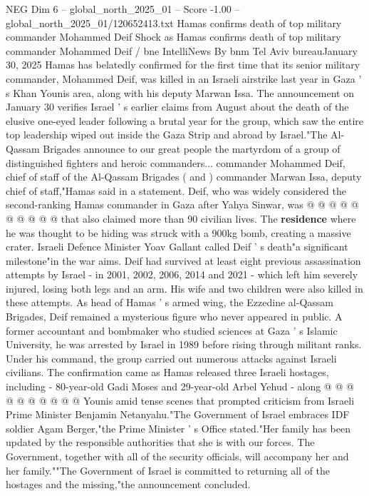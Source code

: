 \begin{textsample}{NEG Dim 6 – global\_north\_2025\_01 – Score -1.00 – global\_north\_2025\_01/120652413.txt}  \label{ex:f6_neg_178}
Hamas confirms death of top military commander Mohammed Deif Shock as Hamas confirms death of top military commander Mohammed Deif / bne IntelliNews By bnm Tel Aviv bureauJanuary 30, 2025 Hamas has belatedly confirmed for the first time that its senior military commander, Mohammed Deif, was killed in an Israeli airstrike last year in Gaza ' s Khan Younis area, along with his deputy Marwan Issa.
The announcement on January 30 verifies Israel ' s earlier claims from August about the death of the elusive one-eyed leader following a brutal year for the group, which saw the entire top leadership wiped out inside the Gaza Strip and abroad by Israel."The Al-Qassam Brigades announce to our great people the martyrdom of a group of distinguished fighters and heroic commanders... commander Mohammed Deif, chief of staff of the Al-Qassam Brigades ( and ) commander Marwan Issa, deputy chief of staff,"Hamas said in a statement.
Deif, who was widely considered the second-ranking Hamas commander in Gaza after Yahya Sinwar, was @ @ @ @ @ @ @ @ @ @ that also claimed more than 90 civilian lives.
The \textbf{residence} where he was thought to be hiding was struck with a 900kg bomb, creating a massive crater.
Israeli Defence Minister Yoav Gallant called Deif ' s death"a significant milestone"in the war aims.
Deif had survived at least eight previous assassination attempts by Israel - in 2001, 2002, 2006, 2014 and 2021 - which left him severely injured, losing both legs and an arm.
His wife and two children were also killed in these attempts.
As head of Hamas ' s armed wing, the Ezzedine al-Qassam Brigades, Deif remained a mysterious figure who never appeared in public.
A former accountant and bombmaker who studied sciences at Gaza ' s Islamic University, he was arrested by Israel in 1989 before rising through militant ranks.
Under his command, the group carried out numerous attacks against Israeli civilians.
The confirmation came as Hamas released three Israeli hostages, including - 80-year-old Gadi Moses and 29-year-old Arbel Yehud - along @ @ @ @ @ @ @ @ @ @ Younis amid tense scenes that prompted criticism from Israeli Prime Minister Benjamin Netanyahu."The Government of Israel embraces IDF soldier Agam Berger,"the Prime Minister ' s Office stated."Her family has been updated by the responsible authorities that she is with our forces.
The Government, together with all of the security officials, will accompany her and her family.""The Government of Israel is committed to returning all of the hostages and the missing,"the announcement concluded.

\end{textsample}
